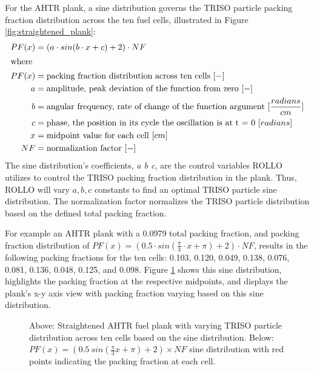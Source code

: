 For the \gls{AHTR} plank, a sine distribution governs the \gls{TRISO} particle packing fraction 
distribution across the ten fuel cells, illustrated in Figure \ref{fig:straightened_plank}:
\begin{align}
    PF(x) &= \left(a\cdot sin(b\cdot x + c) + 2\right) \cdot NF\\
    \intertext{where}
    PF(x) &= \mbox{packing fraction distribution across ten cells } [-] \nonumber \\ 
    a &= \mbox{amplitude, peak deviation of the function from zero } [-] \nonumber \\
    b &= \mbox{angular frequency, rate of change of the function argument } [\frac{radians}{cm}] \nonumber \\
    c &= \mbox{phase, the position in its cycle the oscillation is at t = 0 } [radians]\nonumber \\
    x &= \mbox{midpoint value for each cell } [cm]\nonumber \\
    NF &= \mbox{normalization factor } [-]\nonumber
\end{align}
The sine distribution's coefficients, \textit{a b c}, are the control variables \gls{ROLLO} 
utilizes to control the TRISO packing fraction distribution in the plank.
Thus, \gls{ROLLO} will vary $a, b, c$ constants to find an optimal TRISO particle 
sine distribution. 
The normalization factor normalizes the \gls{TRISO} particle distribution based on the 
defined total packing fraction.

For example an \gls{AHTR} plank with a 0.0979 total packing fraction, and packing fraction 
distribution of $PF(x) = \left(0.5\cdot sin(\frac{\pi}{3}\cdot x + \pi) + 2\right)  \cdot NF$, 
results in the following packing fractions for the ten cells: 0.103, 0.120, 
0.049, 0.138, 0.076, 0.081, 0.136, 0.048, 0.125, and 0.098. 
Figure \ref{fig:triso_distribution} shows this sine distribution, highlights 
the packing fraction at the respective midpoints, and displays the plank's x-y 
axis view with packing fraction varying based on this sine distribution. 
\begin{figure}[htbp]
    \centering
    \caption{Above: Straightened \acrfull{AHTR} fuel plank with varying \gls{TRISO} particle 
    distribution across ten cells based on the sine distribution. 
    Below: $PF(x) = (0.5\ sin(\frac{\pi}{3}x + \pi) + 2)  \times NF$ 
    sine distribution with red points indicating the packing fraction at each cell. }
    \label{fig:triso_distribution}
\end{figure}

